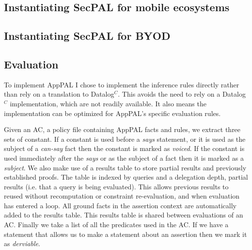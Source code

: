 \documentclass[thesis.tex]{subfiles}
\begin{document}
\subsection{Instantiating SecPAL for mobile ecosystems}
\label{ssec:instantiating}

\subsection{Instantiating SecPAL for BYOD}

\subsection{Evaluation}
\label{ssec:evaluation-alg}

To implement AppPAL I chose to implement the inference rules directly rather than rely on a translation to Datalog$^C$.
This avoids the need to rely on a Datalog$^C$ implementation, which are not readily available.
It also means the implementation can be optimized for AppPAL's specific evaluation rules.

Given an \ac{AC}, a policy file containing AppPAL facts and rules, we extract three sets of constant.
If a constant is used before a \emph{says} statement, or it is used as the subject of a \emph{can-say} fact then the constant is marked as \emph{voiced}.
If the constant is used immediately after the \emph{says} or as the subject of a fact then it is marked as a \emph{subject}.
We also make use of a results table to store partial results and previously established proofs.
The table is indexed by queries and a delegation depth, partial results (i.e. that a query is being evaluated).
This allows previous results to reused without recomputation or constraint re-evaluation, and when evaluation has entered a loop.
All ground facts in the assertion context are automatically added to the results table.
This results table is shared between evaluations of an \ac{AC}.
Finally we take a list of all the predicates used in the \ac{AC}.
If we have a statement that allows us to make a statement about an assertion then we mark it as \emph{derviable}.
\end{document}
